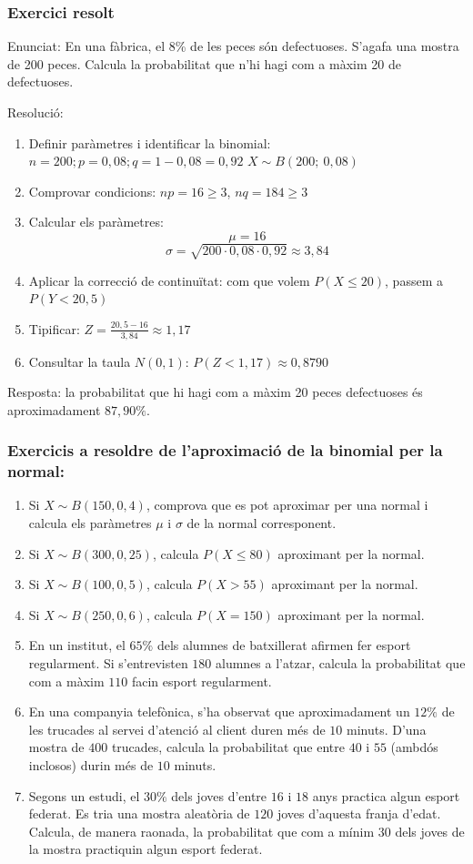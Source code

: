 \subsubsection{Exercici resolt}
Enunciat: En una fàbrica, el 8\% de les peces són defectuoses. S'agafa una mostra de 200 peces. Calcula la probabilitat que n'hi hagi com a màxim 20 de defectuoses.



Resolució:
\begin{enumerate}[(1)]
 \item Definir paràmetres i identificar la binomial: $n=200; p=0,08; q=1-0,08=0,92$ $X \sim B(200;\ 0,08)$
 \item Comprovar condicions: $np=16\geq3$, $nq=184\geq3$
 \item Calcular els paràmetres: $$\mu=16$$ $$\sigma=\sqrt{200 \cdot 0,08 \cdot 0,92}\approx 3,84$$
 \item Aplicar la correcció de continuïtat: com que volem $P(X\leq20)$, passem a $P(Y<20,5)$
 \item Tipificar: $Z=\frac{20,5-16}{3,84}\approx 1,17$
 \item Consultar la taula $N(0,1)$: $P(Z<1,17)\approx 0,8790$
\end{enumerate}

Resposta: la probabilitat que hi hagi com a màxim 20 peces defectuoses és aproximadament $87,90\%$.

\subsubsection{Exercicis a resoldre de l'aproximació de la binomial per la normal:}
\begin{enumerate}
 \item Si $X \sim B(150, 0,4)$, comprova que es pot aproximar per una normal i calcula els paràmetres $\mu$ i $\sigma$ de la normal corresponent.
 \item Si $X \sim B(300, 0,25)$, calcula $P(X \leq 80)$ aproximant per la normal.
 \item Si $X \sim B(100, 0,5)$, calcula $P(X > 55)$ aproximant per la normal.
 \item Si $X \sim B(250, 0,6)$, calcula $P(X = 150)$ aproximant per la normal.
 \item En un institut, el $65\%$ dels alumnes de batxillerat afirmen fer esport regularment. Si s'entrevisten $180$ alumnes a l'atzar, calcula la probabilitat que com a màxim $110$ facin esport regularment.
 \item En una companyia telefònica, s'ha observat que aproximadament un $12\%$ de les trucades al servei d'atenció al client duren més de $10$ minuts. D'una mostra de $400$ trucades, calcula la probabilitat que entre $40$ i $55$ (ambdós inclosos) durin més de $10$ minuts.
 \item Segons un estudi, el $30\%$ dels joves d'entre $16$ i $18$ anys practica algun esport federat. Es tria una mostra aleatòria de $120$ joves d'aquesta franja d'edat. Calcula, de manera raonada, la probabilitat que com a mínim $30$ dels joves de la mostra practiquin algun esport federat.
\end{enumerate}
\newpage

